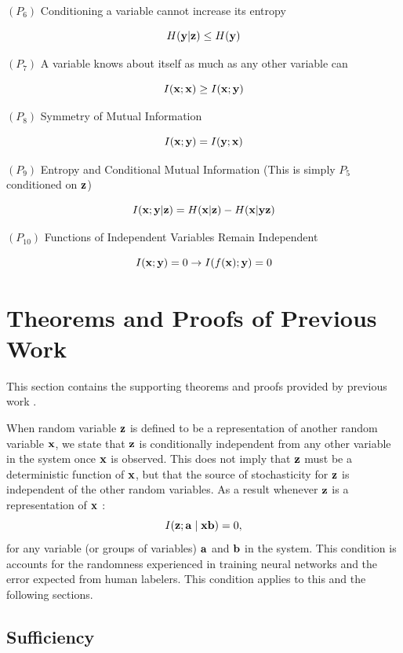 \documentclass{article} %
\theoremstyle{plain}
\theoremstyle{definition}
\theoremstyle{remark}
\begin{document}
$(P_6)$ Conditioning a variable cannot increase its entropy

$$
H({\mathbf{y}}|{\mathbf{z}}) \leq H({\mathbf{y}})
$$

$(P_7)$ A variable knows about itself as much as any other variable can 

$$
I({\mathbf{x}};{\mathbf{x}}) \geq I({\mathbf{x}};{\mathbf{y}}) 
$$

$(P_8)$ Symmetry of Mutual Information

$$
I({\mathbf{x}};{\mathbf{y}}) = I({\mathbf{y}};{\mathbf{x}}) 
$$

$(P_9)$ Entropy and Conditional Mutual Information (This is simply $P_5$ conditioned on ${\mathbf{z}}$)

$$
I({\mathbf{x}};{\mathbf{y}}|{\mathbf{z}})  = H({\mathbf{x}}|{\mathbf{z}}) - H({\mathbf{x}}|{\mathbf{y}}{\mathbf{z}})
$$

$(P_{10})$ Functions of Independent Variables Remain Independent

$$
I({\mathbf{x}}; {\mathbf{y}}) = 0 \rightarrow I(f({\mathbf{x}});{\mathbf{y}}) = 0
$$

\section{Theorems and Proofs of Previous Work}

This section contains the supporting theorems and proofs provided by previous work \citep{federici2020learning}.

When random variable ${\mathbf{z}}$ is defined to be a representation of another random variable ${\mathbf{x}}$, we state that ${\mathbf{z}}$ is conditionally independent from any other variable in the system once ${\mathbf{x}}$ is observed. This does not imply that ${\mathbf{z}}$ must be a deterministic function of ${\mathbf{x}}$, but that the source of stochasticity for ${\mathbf{z}}$ is independent of the other random variables. As a result whenever ${\mathbf{z}}$ is a representation of ${\mathbf{x}}$ :
$$
I({\mathbf{z}} ; {\mathbf{a}} \mid {\mathbf{x}} {\mathbf{b}})=0,
$$
for any variable (or groups of variables) ${\mathbf{a}}$ and ${\mathbf{b}}$ in the system. This condition is accounts for the randomness experienced in training neural networks and the error expected from human labelers. This condition applies to this and the following sections. 

\subsection{Sufficiency}
\end{document}
